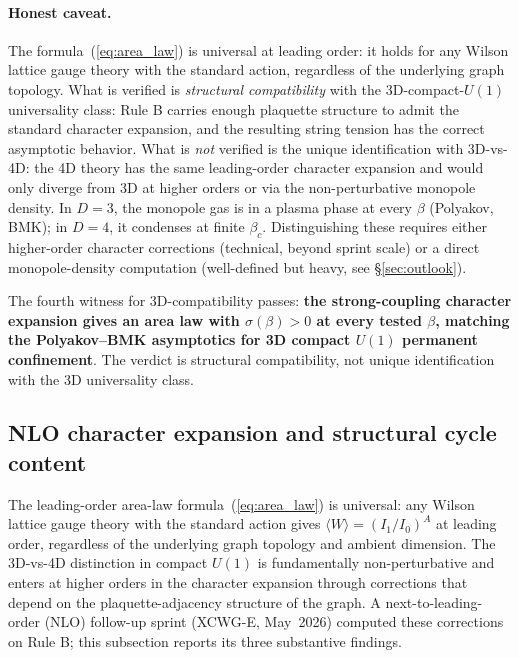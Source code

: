 \documentclass[11pt]{article}
\begin{document}
\paragraph{Honest caveat.}

The formula~(\ref{eq:area_law}) is universal at leading order: it holds for
any Wilson lattice gauge theory with the standard action, regardless of the
underlying graph topology. What is verified is \emph{structural compatibility}
with the 3D-compact-$U(1)$ universality class: Rule B carries enough plaquette
structure to admit the standard character expansion, and the resulting string
tension has the correct asymptotic behavior. What is \emph{not} verified is
the unique identification with 3D-vs-4D: the 4D theory has the same
leading-order character expansion and would only diverge from 3D at higher
orders or via the non-perturbative monopole density. In $D=3$, the monopole
gas is in a plasma phase at every $\beta$ (Polyakov, BMK); in $D=4$, it
condenses at finite $\beta_c$. Distinguishing these requires either
higher-order character corrections (technical, beyond sprint scale) or a direct
monopole-density computation (well-defined but heavy, see
\S\ref{sec:outlook}).

The fourth witness for 3D-compatibility passes: \textbf{the strong-coupling
character expansion gives an area law with $\sigma(\beta)>0$ at every tested
$\beta$, matching the Polyakov--BMK asymptotics for 3D compact $U(1)$
permanent confinement}. The verdict is structural compatibility, not unique
identification with the 3D universality class.

\subsection{NLO character expansion and structural cycle content}
\label{sec:nlo_character}

The leading-order area-law formula~(\ref{eq:area_law}) is universal: any
Wilson lattice gauge theory with the standard action gives
$\langle W\rangle=(I_1/I_0)^{A}$ at leading order, regardless of the underlying
graph topology and ambient dimension. The 3D-vs-4D distinction in compact
$U(1)$ is fundamentally non-perturbative and enters at higher orders in the
character expansion through corrections that depend on the plaquette-adjacency
structure of the graph. A next-to-leading-order (NLO) follow-up sprint
(XCWG-E, May~2026) computed these corrections on Rule B; this subsection
reports its three substantive findings.
\end{document}
